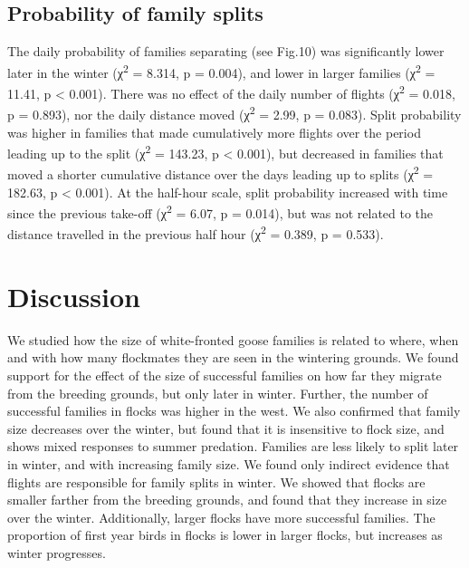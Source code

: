 \documentclass[10pt,twocolumn]{paper}
\begin{document}
\subsection{Probability of family
splits}\label{probability-of-family-splits}

The daily probability of families separating (see Fig.10) was
significantly lower later in the winter (χ\textsuperscript{2} = 8.314, p
= 0.004), and lower in larger families (χ\textsuperscript{2} = 11.41, p
\textless{} 0.001). There was no effect of the daily number of flights
(χ\textsuperscript{2} = 0.018, p = 0.893), nor the daily distance moved
(χ\textsuperscript{2} = 2.99, p = 0.083). Split probability was higher
in families that made cumulatively more flights over the period leading
up to the split (χ\textsuperscript{2} = 143.23, p \textless{} 0.001),
but decreased in families that moved a shorter cumulative distance over
the days leading up to splits (χ\textsuperscript{2} = 182.63, p
\textless{} 0.001). At the half-hour scale, split probability increased
with time since the previous take-off (χ\textsuperscript{2} = 6.07, p =
0.014), but was not related to the distance travelled in the previous
half hour (χ\textsuperscript{2} = 0.389, p = 0.533).

\section{Discussion}\label{discussion}

We studied how the size of white-fronted goose families is related to
where, when and with how many flockmates they are seen in the wintering
grounds. We found support for the effect of the size of successful
families on how far they migrate from the breeding grounds, but only
later in winter. Further, the number of successful families in flocks
was higher in the west. We also confirmed that family size decreases
over the winter, but found that it is insensitive to flock size, and
shows mixed responses to summer predation. Families are less likely to
split later in winter, and with increasing family size. We found only
indirect evidence that flights are responsible for family splits in
winter. We showed that flocks are smaller farther from the breeding
grounds, and found that they increase in size over the winter.
Additionally, larger flocks have more successful families. The
proportion of first year birds in flocks is lower in larger flocks, but
increases as winter progresses.
\end{document}

